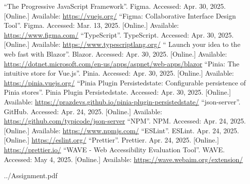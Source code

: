 \documentclass[12pt, a4paper]{article}
\begin{document}
\begin{thebibliography}{9}
        ``The Progressive JavaScript Framework''. Figma. Accessed: Apr. 30, 2025. [Online.]
        Available: \url{https://vuejs.org/}
        ``Figma: Collaborative Interface Design Tool''. Figma. Accessed: Mar. 13, 2025. [Online.]
        Available: \url{https://www.figma.com/}
        ``TypeScript''. TypeScript. Accessed: Apr. 30, 2025. [Online.] Available:
        \url{https://www.typescriptlang.org/}
        `` Launch your idea to the web fast with Blazor''. Blazor. Accessed: Apr. 30, 2025.
        [Online.] Available: \url{https://dotnet.microsoft.com/en-us/apps/aspnet/web-apps/blazor}
        ``Pinia: The intuitive store for Vue.js''. Pinia. Accessed: Apr. 30, 2025. [Online.]
        Available: \url{https://pinia.vuejs.org/}
        ``Pinia Plugin Persistedstate: Configurable persistence of Pinia stores''.
        Pinia Plugin Persistedstate. Accessed: Apr. 30, 2025. [Online.] Available:
        \url{https://prazdevs.github.io/pinia-plugin-persistedstate/}
        ``json-server''. GitHub. Accessed: Apr. 24, 2025. [Online.] Available:
        \url{https://github.com/typicode/json-server}
        ``NPM''. NPM. Accessed: Apr. 24, 2025. [Online.] Available: \url{https://www.npmjs.com/}
        ``ESLint''. ESLint. Apr. 24, 2025. [Online.] \url{https://eslint.org/}
        ``Prettier''. Prettier. Apr. 24, 2025. [Online.] \url{https://prettier.io/}
        ``WAVE - Web Accessibility Evaluation Tool''. WAVE. Accessed: May 4, 2025. [Online.]
        Available: \url{https://wave.webaim.org/extension/}
\end{thebibliography}
\endgroup


    {../Assignment.pdf}

\end{document}
